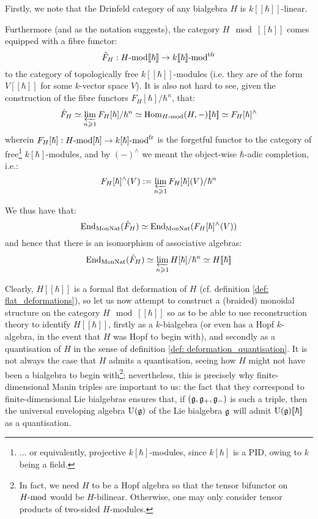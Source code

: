         \begin{remark} \label{remark: formal_properties_of_drinfeld_categories}
            Firstly, we note that the Drinfeld category of any bialgebra $H$ is $k[\![\hbar]\!]$-linear.
            
            Furthermore (and as the notation suggests), the category $H\mod[\![\hbar]\!]$ comes equipped with a fibre functor:
                $$\hat{F}_H: H\mod[\![\hbar]\!] \to k[\![\hbar]\!]\mod^{\tfr}$$
            to the category of topologically free $k[\![\hbar]\!]$-modules (i.e. they are of the form $V[\![\hbar]\!]$ for some $k$-vector space $V$). It is also not hard to see, given the construction of the fibre functors $F_H[\hbar]/\hbar^n$, that:
                $$\hat{F}_H \cong \projlim_{n \geq 1} F_H[\hbar]/\hbar^n \cong \Hom_{H\mod}(H, -)[\![\hbar]\!] \cong F_H[\hbar]^{\wedge}$$
            wherein $F_H[\hbar]: H\mod[\hbar] \to k[\hbar]\mod^{\fr}$ is the forgetful functor to the category of free\footnote{... or equivalently, projective $k[\hbar]$-modules, since $k[\hbar]$ is a PID, owing to $k$ being a field.} $k[\hbar]$-modules, and by $(-)^{\wedge}$ we meant the object-wise $\hbar$-adic completion, i.e.:
                $$F_H[\hbar]^{\wedge}(V) := \projlim_{n \geq 1} F_H[\hbar](V)/\hbar^n$$
            
            We thus have that:
                $$\End_{\Mon\Nat}(\hat{F}_H) \cong \End_{\Mon\Nat}(F_H[\hbar]^{\wedge}(V))$$
            and hence that there is an isomorphism of associative algebras:
                $$\End_{\Mon\Nat}(\hat{F}_H) \cong \projlim_{n \geq 1} H[\hbar]/\hbar^n \cong H[\![\hbar]\!]$$
        \end{remark}
        Clearly, $H[\![\hbar]\!]$ is a formal flat deformation of $H$ (cf. definition \ref{def: flat_deformations}), so let us now attempt to construct a (braided) monoidal structure on the category $H\mod[\![\hbar]\!]$ so as to be able to use reconstruction theory to identify $H[\![\hbar]\!]$, firstly as a $k$-bialgebra (or even has a Hopf $k$-algebra, in the event that $H$ was Hopf to begin with), and secondly as a quantisation of $H$ in the sense of definition \ref{def: deformation_quantisation}. It is not always the case that $H$ admits a quantisation, seeing how $H$ might not have been a bialgebra to begin with\footnote{In fact, we need $H$ to be a Hopf algebra so that the tensor bifunctor on $H\mod$ would be $H$-bilinear. Otherwise, one may only consider tensor products of two-sided $H$-modules.}; nevertheless, this is precisely why finite-dimensional Manin triples are important to us: the fact that they correspond to finite-dimensional Lie bialgebras ensures that, if $(\g, \g_+, \g_-)$ is such a triple, then the universal enveloping algebra $\rmU(\g)$ of the Lie bialgebra $\g$ will admit $\rmU(\g)[\![\hbar]\!]$ as a quantisation.